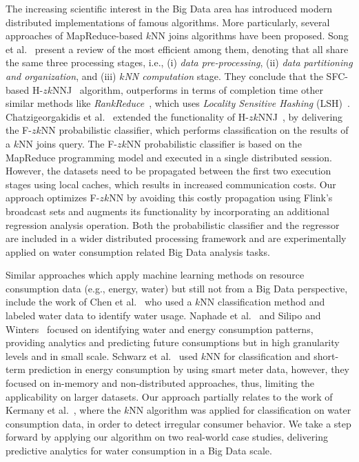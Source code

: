 The increasing scientific interest in the Big Data area has introduced modern distributed implementations of famous algorithms. More particularly, several approaches of MapReduce-based $k$NN joins algorithms have been proposed. Song et al.~\cite{song2015hal} present a review of the most efficient among them, denoting that all share the same three processing stages, i.e., (i) \textit{data pre-processing}, (ii) \textit{data partitioning and organization}, and (iii) \textit{$k$NN computation} stage. They conclude that the SFC-based H-$zk$NNJ~\cite{zhang2012epk} algorithm, outperforms in terms of completion time other similar methods like \textit{RankReduce}~\cite{stupar2010rankreduce}, which uses \textit{Locality Sensitive Hashing} (LSH)~\cite{indyk1998ann}. Chatzigeorgakidis et al.~\cite{chatzigeorgakidis2015mapreduce} extended the functionality of H-$zk$NNJ~\cite{zhang2012epk}, by delivering the F-$zk$NN probabilistic classifier, which performs classification on the results of a $k$NN joins query. The F-$zk$NN probabilistic classifier is based on the MapReduce programming model and executed in a single distributed session. However, the datasets need to be propagated between the first two execution stages using local caches, which results in increased communication costs. Our approach optimizes F-$zk$NN by avoiding this costly propagation using Flink's broadcast sets and augments its functionality by incorporating an additional regression analysis operation. Both the probabilistic classifier and the regressor are included in a wider distributed processing framework and are experimentally applied on water consumption related Big Data analysis tasks.

Similar approaches which apply machine learning methods on resource consumption data (e.g., energy, water) but still not from a Big Data perspective, include the work of Chen et al.~\cite{chen2011aab} who used a $k$NN classification method and labeled water data to identify water usage. Naphade et al.~\cite{swp2011} and Silipo and Winters~\cite{bdse2013} focused on identifying water and energy consumption patterns, providing analytics and predicting future consumptions but in high granularity levels and in small scale. Schwarz et al.~\cite{schwarz2012lpss} used $k$NN for classification and short-term prediction in energy consumption by using smart meter data, however, they focused on in-memory and non-distributed approaches, thus, limiting the applicability on larger datasets. Our approach partially relates to the work of Kermany et al.~\cite{Kermany2013aam}, where the $k$NN algorithm was applied for classification on water consumption data, in order to detect irregular consumer behavior. We take a step forward by applying our algorithm on two real-world case studies, delivering predictive analytics for water consumption in a Big Data scale.